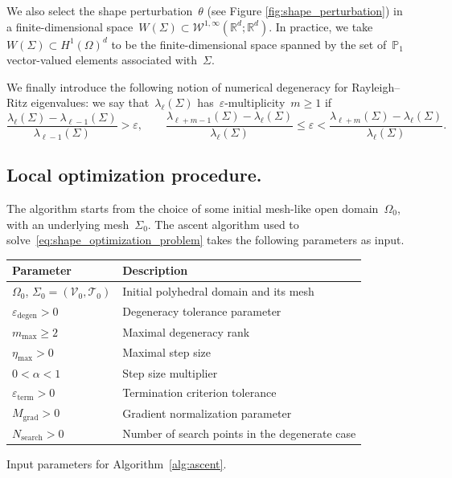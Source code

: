 \documentclass[a4]{article}
\renewcommand{\P}{\mathbb{P}}
\newcommand{\R}{\mathbb{R}}
\newcommand{\1}{\mathbbm 1}
\newcommand{\Winf}{{{\cW}^{1,\infty}}}
\newcommand{\cW}{\mathcal{W}}
\begin{document}
We also select the shape perturbation~$\theta$ (see Figure \ref{fig:shape_perturbation}) in a finite-dimensional space~$W(\Sigma)\subset \Winf(\R^d;\R^d)$. In practice, we take~$W(\Sigma) \subset H^1(\Omega)^d$ to be the finite-dimensional space spanned by the set of~$\P_1$ vector-valued elements associated with~$\Sigma$.

We finally introduce the following notion of numerical degeneracy for Rayleigh--Ritz eigenvalues:
we say that~$\lambda_\ell(\Sigma)$ has~$\varepsilon$-multiplicity~$m \geq 1$ if
    \begin{equation}
        \label{eq:degeneracy}
        \frac{\lambda_{\ell}(\Sigma)-\lambda_{\ell-1}(\Sigma)}{\lambda_{\ell-1}(\Sigma)} > \varepsilon,\qquad \frac{\lambda_{\ell+m-1}(\Sigma)-\lambda_\ell(\Sigma)}{\lambda_\ell(\Sigma)} \leq \varepsilon < \frac{\lambda_{\ell+m}(\Sigma)-\lambda_\ell(\Sigma)}{\lambda_\ell(\Sigma)}.
    \end{equation}

\subsection{Local optimization procedure.}
\label{subsec:local_opt}
The algorithm starts from the choice of some initial mesh-like open domain~$\Omega_0$, with an underlying mesh~$\Sigma_0$.
The ascent algorithm used to solve~\eqref{eq:shape_optimization_problem} takes the following parameters as input.

\noindent
{
\begin{center}
\begin{tabular}{ll}
\toprule
\textbf{Parameter} & \textbf{Description} \\
\midrule
$\Omega_0$, $\Sigma_0 = (\mathcal{V}_0, \mathcal{T}_0)$ & Initial polyhedral domain and its mesh \\
$\varepsilon_{\mathrm{degen}} > 0$ & Degeneracy tolerance parameter \\
$m_{\mathrm{max}} \geq 2$ & Maximal degeneracy rank \\
$\eta_{\mathrm{max}} > 0$ & Maximal step size \\
$0 < \alpha < 1$ & Step size multiplier \\
$\varepsilon_{\mathrm{term}} > 0$ & Termination criterion tolerance \\
$M_{\mathrm{grad}}>0$ & Gradient normalization parameter \\
$N_{\mathrm{search}}>0$ & Number of search points in the degenerate case\\
\bottomrule
\end{tabular}

\noindent
Input parameters for Algorithm~\ref{alg:ascent}.
\end{center}
}
\end{document}
